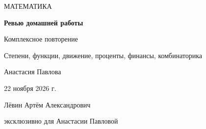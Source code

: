 \documentclass[a4paper,12pt]{article}
\begin{document}
\thispagestyle{empty}
\begin{center}
\vspace*{31mm}
{\Large\color{accent} МАТЕМАТИКА}\par
\vspace{19mm}
{\huge\bfseries Ревью домашней работы}\par
\vspace{9mm}
{\Large\color{accent} Комплексное повторение}\par
\vspace{5mm}
{\large Степени, функции, движение, проценты, финансы, комбинаторика}\par
\vspace{19mm}
{\large Анастасия Павлова}\par
\vspace{16mm}
{\large 22 ноября 2026 г.}\par
\vfill
{\normalsize Лёвин Артём Александрович}\par
{\small эксклюзивно для Анастасии Павловой}\par
\vspace{11mm}
\vspace{3mm}
\end{center}

\clearpage
\end{document}
